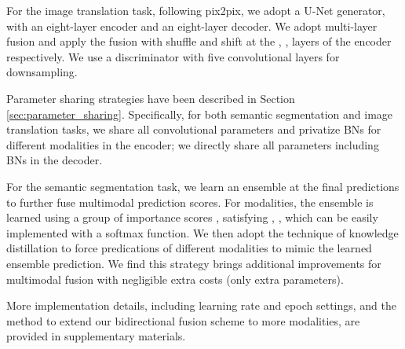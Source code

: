 \documentclass[sigconf]{acmart}
\begin{document}
For the image translation task, following pix2pix, we adopt a U-Net \cite{DBLP:conf/miccai/RonnebergerFB15} generator, with an eight-layer encoder and an eight-layer decoder. We adopt multi-layer fusion and apply the fusion with shuffle and shift at the , ,  layers of the encoder respectively. We use a discriminator with five convolutional layers for downsampling. 

Parameter sharing strategies have been described in Section \ref{sec:parameter_sharing}. Specifically, for both semantic segmentation and image translation tasks, we share all convolutional parameters and privatize BNs for different modalities in the encoder; we directly share all parameters including BNs in the decoder.

For the semantic segmentation task, we learn an ensemble at the final predictions to further fuse multimodal prediction scores. For  modalities, the ensemble is learned using a group of importance scores , satisfying , , which can be easily implemented with a softmax function. We then adopt the technique of knowledge distillation to force predications of different modalities to mimic the learned ensemble prediction. We find this strategy brings additional improvements for multimodal fusion with negligible extra costs (only  extra parameters).

More implementation details, including learning rate and epoch settings, and the method to extend our bidirectional fusion scheme to more modalities, are provided in supplementary materials.
\end{document}
